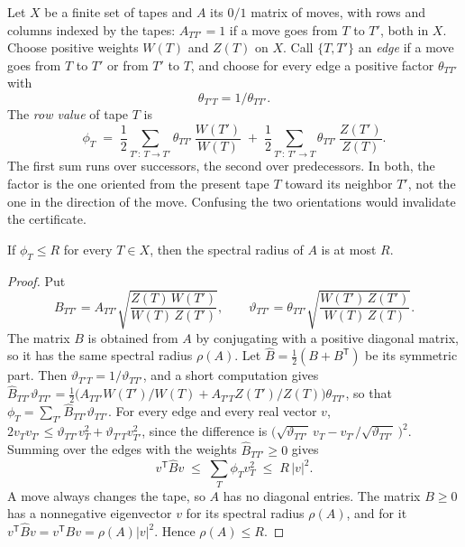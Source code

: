 Let $X$ be a finite set of tapes and $A$ its $0/1$ matrix of moves, with rows and columns indexed by the tapes:
$A_{TT'}=1$ if a move goes from $T$ to $T'$, both in $X$. Choose positive weights $W(T)$ and $Z(T)$ on $X$. Call
$\{T,T'\}$ an \emph{edge} if a move goes from $T$ to $T'$ or from $T'$ to $T$, and choose for every edge a positive
factor $\theta_{TT'}$ with
\begin{equation}\label{eq:recip}
  \theta_{T'T}=1/\theta_{TT'}.
\end{equation}
The \emph{row value} of tape $T$ is
\begin{equation}\label{eq:row}
  \phi_T \;=\; \frac12\sum_{T':\ T\to T'}\theta_{TT'}\,\frac{W(T')}{W(T)}\;+\;\frac12\sum_{T':\ T'\to T}\theta_{TT'}\,\frac{Z(T')}{Z(T)}.
\end{equation}
The first sum runs over successors, the second over predecessors. In both, the factor is the one oriented from the
present tape $T$ toward its neighbor $T'$, not the one in the direction of the move. Confusing the two orientations
would invalidate the certificate.

\begin{lemma}\label{lem:paired}
If $\phi_T\le R$ for every $T\in X$, then the spectral radius of $A$ is at most $R$.
\end{lemma}

\begin{proof}
Put
\[ B_{TT'}=A_{TT'}\sqrt{\frac{Z(T)\,W(T')}{W(T)\,Z(T')}},\qquad
   \vartheta_{TT'}=\theta_{TT'}\sqrt{\frac{W(T')\,Z(T')}{W(T)\,Z(T)}} . \]
The matrix $B$ is obtained from $A$ by conjugating with a positive diagonal matrix, so it has the same spectral
radius $\rho(A)$. Let $\widehat B=\frac12(B+B^{\mathsf T})$ be its symmetric part. Then
$\vartheta_{T'T}=1/\vartheta_{TT'}$, and a short computation gives $\widehat B_{TT'}\vartheta_{TT'}=\frac12\bigl(A_{TT'}W(T')/W(T)+A_{T'T}Z(T')/Z(T)\bigr)\theta_{TT'}$,
so that $\phi_T=\sum_{T'}\widehat B_{TT'}\vartheta_{TT'}$. For every edge and every real vector $v$,
$2v_Tv_{T'}\le \vartheta_{TT'}v_T^2+\vartheta_{T'T}v_{T'}^2$, since the difference is
$\bigl(\sqrt{\vartheta_{TT'}}\,v_T-v_{T'}/\sqrt{\vartheta_{TT'}}\,\bigr)^2$. Summing over the edges with the weights
$\widehat B_{TT'}\ge0$ gives
\[ v^{\mathsf T}\widehat Bv\;\le\;\sum_T\phi_Tv_T^2\;\le\;R\,\lvert v\rvert^2 . \]
A move always changes the tape, so $A$ has no diagonal entries. The matrix $B\ge0$ has a nonnegative eigenvector $v$
for its spectral radius $\rho(A)$, and for it $v^{\mathsf T}\widehat Bv=v^{\mathsf T}Bv=\rho(A)\lvert v\rvert^2$. Hence
$\rho(A)\le R$.
\end{proof}


